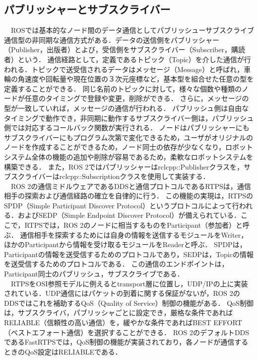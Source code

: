 \subsection{パブリッシャーとサブスクライバー}
　ROSでは基本的なノード間のデータ通信としてパブリッシューサブスクライブ通信型の非同期な通信方式がある．データの送信側をパブリッシャー（Publisher，出版者）とよび，受信側をサブスクライバー（Subscriber，購読者）という．
通信経路として，定義であるトピック（Topic）を介した通信が行われる．トピックで送受信されるデータはメッセージ（Message）と呼ばれ，車輪の角速度や回転量や現在位置の３次元座標など，基本型を組合せた任意の型を定義することができる．
同じ名前のトピックに対して，様々な個数や種類のノードが任意のタイミングで登録や変更，削除ができる．
さらに，メッセージの型が一致していれば，メッセージの通信が行われる．
パブリッシュ側は自由なタイミングで動作でき，非同期に動作するサブスクライバー側は，パブリッシュ側では対応するコールバック関数が実行される．
ノードはパブリッシャーにもサブスクライバーにもプログラム次第で変化できるため，ユーザがオリジナルのノードを作成することができるため，ノード同士の依存が少なくなり，ロボットシステム全体の機能の追加や削除が容易であるため，柔軟なロボットシステムを構築できる．
また，ROS 2ではパブリッシャーはrclcpp::Publisherクラスを，サブスクライバーはrclcpp::Subscriptionクラスを使用して実装する．
\\　ROS 2の通信ミドルウェアであるDDSと通信プロトコルであるRTPSは，通信相手の探索および通信経路の確立を自律的に行う．
この機能の実現は，RTPSのSPDP（Simple Participant Discover Protocol）というプロトコルによって行われる．およびSEDP（Simple Endpoint Discover Protocol）が備えられている．ここで，RTPSでは，ROS 2のノードに相当するものをParticipant（参加者）と呼ぶ．
通信相手を探索するためには自身の情報を送信するモジュールをWriter，ほかのParticipantから情報を受け取るモジュールをReaderと呼ぶ．
SPDPは，Participantの情報を送受信するためのプロトコルであり，SEDPは，Topicの情報を送受信するためのプロトコルである．
この通信のエンドポイントは，Participant同士のパブリッシュ，サブスクライブである．
\\　RTPSをOSI参照モデルに例えるとtransport層に位置し，UDP/IPの上に実装されている．UDP通信にはパケットの到着に関する保証がないが，ROS 2のDDSではこれを補助するQoS（Quality of Service）制御の機能がある．
QoS制御は，サブスクライバ，パブリッシャごとに設定でき，厳格な条件であればRELIABLE（信頼性の高い通信）を，緩やかな条件であればBEST EFFORT（ベストエフォート通信）を選択することができる．
ROS 2のデフォルトDDSであるFastRTPSでは，QoS制御の機能が実装されており，各ノードが通信するときのQoS設定はRELIABLEである．
